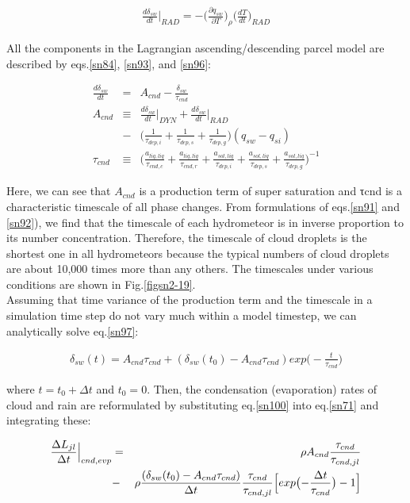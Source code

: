 \begin{eqnarray}
\frac{d\delta_{sw}}{dt}\Bigr|_{RAD}=-\bigl(\frac{\partial q_{sw}}{\partial T}\bigr)_{\rho}\bigl(\frac{dT}{dt}\bigr)_{RAD}\label{sn96}
\end{eqnarray}

All the components in the Lagrangian ascending/descending parcel model are described by eqs.\ref{sn84}, \ref{sn93}, and \ref{sn96}:

\begin{eqnarray}
\frac{d\delta_{sw}}{dt}&=&A_{cnd}-\frac{\delta_{sw}}{\tau_{cnd}}\label{sn97}\\
A_{cnd}&\equiv&\frac{d\delta_{sw}}{dt}\Bigr|_{DYN}+\frac{d\delta_{sw}}{dt}\Bigr|_{RAD}\nonumber\\
&-&\bigl(\frac{1}{\tau_{dep,i}}+\frac{1}{\tau_{dep,s}}+\frac{1}{\tau_{dep,g}}\bigr)(q_{sw}-q_{si})\label{sn98}\\
\tau_{cnd}&\equiv&\bigl(\frac{a_{liq,liq}}{\tau_{cnd,c}}+\frac{a_{liq,liq}}{\tau_{cnd,r}}+\frac{a_{sol,liq}}{\tau_{dep,i}}+\frac{a_{sol,liq}}{\tau_{dep,s}}+\frac{a_{sol,liq}}{\tau_{dep,g}}\bigr)^{-1}\label{sn99}
\end{eqnarray}

Here, we can see that $A_{cnd}$ is a production term of super saturation and τcnd is a characteristic timescale of all phase changes. From formulations of eqs.\ref{sn91} and \ref{sn92}), we find that the timescale of each hydrometeor is in inverse proportion to its number concentration. Therefore, the timescale of cloud droplets is the shortest one in all hydrometeors because the typical numbers of cloud droplets are about 10,000 times more than any others. The timescales under various conditions are shown in Fig.\ref{figsn2-19}.\\
Assuming that time variance of the production term and the timescale in a simulation time step do not vary much within a model timestep, we can analytically solve eq.\ref{sn97}:

\begin{eqnarray}
\delta_{sw}(t)=A_{cnd}\tau_{cnd}+(\delta_{sw}(t_{0})-A_{cnd}\tau_{cnd})exp\bigl(-\frac{t}{\tau_{cnd}}\bigr)\label{sn100}
\end{eqnarray}

where $t = t_{0} + \Delta t$ and $t_{0} = 0$. Then, the condensation (evaporation) rates of cloud and rain are reformulated by substituting eq.\ref{sn100} into eq.\ref{sn71} and integrating these:

\begin{eqnarray}
\frac{\Delta L_{jl}}{\Delta t}\Bigr|_{cnd,evp}&=&\rho A_{cnd}\frac{\tau_{cnd}}{\tau_{cnd,jl}}\nonumber\\
&-&\rho\frac{(\delta_{sw}(t_{0})-A_{cnd}\tau_{cnd})}{\Delta t}\frac{\tau_{cnd}}{\tau_{cnd,jl}}\Bigl[exp\bigl(-\frac{\Delta t}{\tau_{cnd}}\bigr)-1\Bigr]\label{sn101}
\end{eqnarray}

